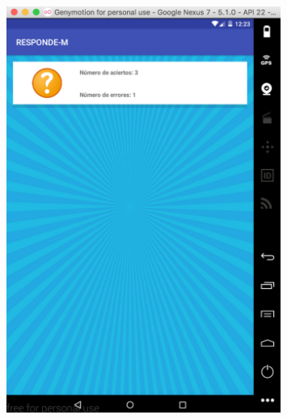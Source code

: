 \documentclass[10pt]{article}
\begin{document}
\begin{figure}[H]
	\begin{center}
 		\includegraphics[width = 0.8\textwidth]{Imagenes/captura4.eps}
	\end{center} 
\end{figure}
\end{document}
